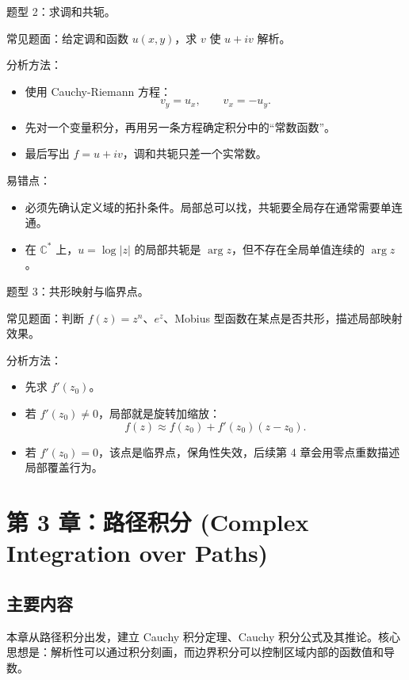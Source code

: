 \documentclass{article}
\begin{document}
题型 2：求调和共轭。

常见题面：给定调和函数 $u(x,y)$，求 $v$ 使 $u+iv$
解析。

分析方法：

\begin{itemize}
\item
  使用 Cauchy-Riemann 方程： \[
  v_y=u_x,\qquad v_x=-u_y.
  \]
\item
  先对一个变量积分，再用另一条方程确定积分中的``常数函数''。
\item
  最后写出 $f=u+iv$，调和共轭只差一个实常数。
\end{itemize}

易错点：

\begin{itemize}
\item
  必须先确认定义域的拓扑条件。局部总可以找，共轭要全局存在通常需要单连通。
\item
  在 \(\mathbb C^*\)
  上，\(u=\log|z|\) 的局部共轭是
  \(\arg z\)，但不存在全局单值连续的 \(\arg z\)。
\end{itemize}

题型 3：共形映射与临界点。

常见题面：判断 $f(z)=z^n$、$e^z$、Mobius
型函数在某点是否共形，描述局部映射效果。

分析方法：

\begin{itemize}
\item
  先求 $f'(z_0)$。
\item
  若 $f'(z_0)\ne 0$，局部就是旋转加缩放：
  \[
  f(z)\approx f(z_0)+f'(z_0)(z-z_0).
  \]
\item
  若 $f'(z_0)=0$，该点是临界点，保角性失效，后续第
  4 章会用零点重数描述局部覆盖行为。
\end{itemize}

\section{第 3 章：路径积分 (Complex Integration over Paths)}

\subsection{主要内容}

本章从路径积分出发，建立 Cauchy 积分定理、Cauchy
积分公式及其推论。核心思想是：解析性可以通过积分刻画，而边界积分可以控制区域内部的函数值和导数。
\end{document}

